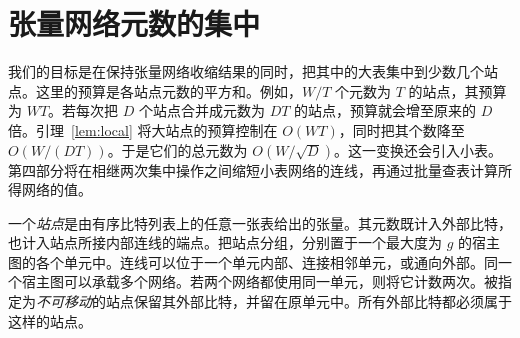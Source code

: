 \section{张量网络元数的集中}\label{sec:local}

我们的目标是在保持张量网络收缩结果的同时，把其中的大表集中到少数几个站点。这里的预算是各站点元数的平方和。例如，\(W/T\) 个元数为 \(T\) 的站点，其预算为 \(WT\)。若每次把 \(D\) 个站点合并成元数为 \(DT\) 的站点，预算就会增至原来的 \(D\) 倍。引理~\ref{lem:local} 将大站点的预算控制在 \(O(WT)\)，同时把其个数降至 \(O(W/(DT))\)。于是它们的总元数为 \(O(W/\sqrt D)\)。这一变换还会引入小表。第四部分将在相继两次集中操作之间缩短小表网络的连线，再通过批量查表计算所得网络的值。

一个\emph{站点}是由有序比特列表上的任意一张表给出的张量。其元数既计入外部比特，也计入站点所接内部连线的端点。把站点分组，分别置于一个最大度为 \(g\) 的宿主图的各个单元中。连线可以位于一个单元内部、连接相邻单元，或通向外部。同一个宿主图可以承载多个网络。若两个网络都使用同一单元，则将它计数两次。被指定为\emph{不可移动}的站点保留其外部比特，并留在原单元中。所有外部比特都必须属于这样的站点。

